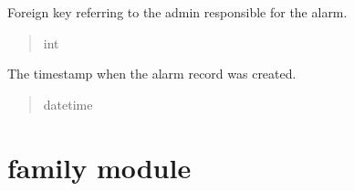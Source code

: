 \documentclass[letterpaper,10pt,english]{sphinxmanual}
\begin{document}
\begin{fulllineitems}
\begin{fulllineitems}
\begin{quote}
\begin{description}
\end{description}\end{quote}

\end{fulllineitems}


\begin{fulllineitems}
\label{\detokenize{app.models:app.models.alarm.Alarm.idAdmin}}
\pysigstartsignatures
\pysigline
{}
\pysigstopsignatures
\sphinxAtStartPar
Foreign key referring to the admin responsible for the alarm.
\begin{quote}\begin{description}
\sphinxAtStartPar
int

\end{description}\end{quote}

\end{fulllineitems}


\begin{fulllineitems}
\label{\detokenize{app.models:app.models.alarm.Alarm.createDate}}
\pysigstartsignatures
\pysigline
{}
\pysigstopsignatures
\sphinxAtStartPar
The timestamp when the alarm record was created.
\begin{quote}\begin{description}
\sphinxAtStartPar
datetime

\end{description}\end{quote}

\end{fulllineitems}


\end{fulllineitems}



\section{family module}
\label{\detokenize{app.models:module-app.models.family}}\label{\detokenize{app.models:family-module}}
\end{document}
